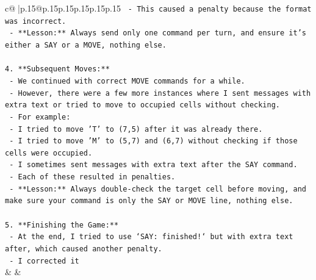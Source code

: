 \documentclass{article}
\begin{document}
{\begin{supertabular}{c@{$\;$}|p{.15\linewidth}@{}p{.15\linewidth}p{.15\linewidth}p{.15\linewidth}p{.15\linewidth}p{.15\linewidth}}
{{{\texttt{   {-} This caused a penalty because the format was incorrect.} \\
\texttt{   {-} **Lesson:** Always send only one command per turn, and ensure it's either a SAY or a MOVE, nothing else.} \\
\\ 
\texttt{4. **Subsequent Moves:**} \\
\texttt{   {-} We continued with correct MOVE commands for a while.} \\
\texttt{   {-} However, there were a few more instances where I sent messages with extra text or tried to move to occupied cells without checking.} \\
\texttt{   {-} For example:} \\
\texttt{     {-} I tried to move 'T' to (7,5) after it was already there.} \\
\texttt{     {-} I tried to move 'M' to (5,7) and (6,7) without checking if those cells were occupied.} \\
\texttt{     {-} I sometimes sent messages with extra text after the SAY command.} \\
\texttt{   {-} Each of these resulted in penalties.} \\
\texttt{   {-} **Lesson:** Always double{-}check the target cell before moving, and make sure your command is only the SAY or MOVE line, nothing else.} \\
\\ 
\texttt{5. **Finishing the Game:**} \\
\texttt{   {-} At the end, I tried to use `SAY: finished!` but with extra text after, which caused another penalty.} \\
\texttt{   {-} I corrected it} \\
            }
        }
    }
    & & \\ \\


\end{supertabular}}
\end{document}
